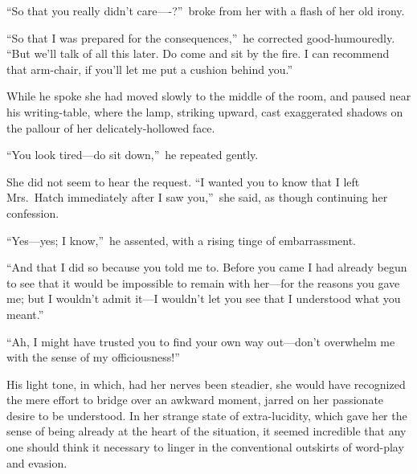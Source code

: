 \documentclass[12pt,a4paper]{book}
\begin{document}
``So that you really didn't care----?''\ broke from her with a flash
of her old irony.





``So that I was prepared for the consequences,''\ he corrected
good-humouredly. ``But we'll talk of all this later. Do come and
sit by the fire. I can recommend that arm-chair, if you'll let me
put a cushion behind you.''





While he spoke she had moved slowly to the middle of the room,
and paused near his writing-table, where the lamp,
striking upward, cast exaggerated shadows on the pallour of her
delicately-hollowed face.





``You look tired---do sit down,''\ he repeated gently.





She did not seem to hear the request. ``I wanted you to know that
I left Mrs.\ Hatch immediately after I saw you,''\ she said, as
though continuing her confession.





``Yes---yes; I know,''\ he assented, with a rising tinge of
embarrassment.





``And that I did so because you told me to. Before you came I had
already begun to see that it would be impossible to remain with
her---for the reasons you gave me; but I wouldn't admit it---I
wouldn't let you see that I understood what you meant.''





``Ah, I might have trusted you to find your own way out---don't
overwhelm me with the sense of my officiousness!''





His light tone, in which, had her nerves been steadier, she would
have recognized the mere effort to bridge over an awkward moment,
jarred on her passionate desire to be understood. In her strange
state of extra-lucidity, which gave her the sense of being
already at the heart of the situation, it seemed incredible that
any one should think it necessary to linger in the conventional
outskirts of word-play and evasion.
\end{document}

